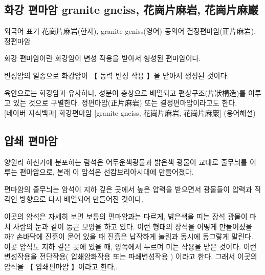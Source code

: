 \documentclass[12pt, a4paper, twoside]{book}
\begin{document}
		\subsection{화강 편마암 granite gneiss, 花崗片麻岩, 花崗片麻巖  }

				외국어 표기 花崗片麻岩(한자), granite geniss(영어) 
				동의어 결정편마암(正片麻岩), 정편마암 
				
				화강 편마암이란 화강암이 변성 작용을 받아서 형성된 편마암이다.
				
				변성암의 일종으로 화강암이 【 동력 변성 작용 】을 받아서 생성된 것이다. 
				
				
				육안으로는 화강암과 유사하나, 성분이 층상으로 배열되고 편상구조(片狀構造)를 이루고 있는 것으로 구별한다. 정편마암(正片麻岩) 또는 결정편마암이라고도 한다.  \\
				
				[네이버 지식백과] 화강편마암 [granite gneiss, 花崗片麻岩, 花崗片麻巖] (용어해설)


		\subsection{압쇄 편마암}

				양원리 하천가에 분포하는 람석은 어두운색광물과 밝은색 광물이 교대로 줄무늬를 이루는 편마암으로, 본래 이 암석은 선캄브리아시대에 만들어졌다. 
				
				편마암의 줄무늬는 암석이 지하 깊은 곳에서 높은 압력을 받으면서 광물들이 압력과 직각인 방향으로 다시 배열되어 만들어진 것이다.
				
				이곳의 암석은 자세히 보면 보통의 편마암과는 다르게, 밝은색을 띠는 장석 광물이 마치 사람의 눈과 같이 둥근 모양을 하고 있다. 
				이런 형태의 장석을 어떻게 만들어졌을까? 손바닥에 진흙이 묻어 있을 때 진흙은 납작하게 눌림과 동시에 동그랗게 말린다. 
				이곳 암석도 지하 깊은 곳에 있을 때, 양쪽에서 누르며 미는 작용을 받은 것이다. 
				이런 변성작용을 전단작용( 압쇄암화작용 또는 파쇄변성작용 ) 이라고 한다. 
				그래서 이곳의 암석을 【 압쇄편마암 】이라고 한다,.
				
				
\end{document}
